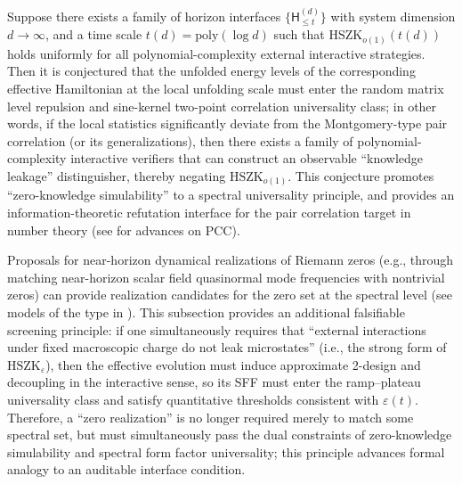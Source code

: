\begin{conjecture}[Spectral rigidity conjecture for horizon zero-knowledge: HSZK \texorpdfstring{$\Rightarrow$}{=>} sine-kernel correlations]\label{conj:discussion-horizon-zk-rigidity}
Suppose there exists a family of horizon interfaces \(\{\mathsf{H}^{(d)}_{\le t}\}\) with system dimension \(d\to\infty\), and a time scale \(t(d)=\mathrm{poly}(\log d)\) such that
\(\mathrm{HSZK}_{o(1)}(t(d))\)
holds uniformly for all polynomial-complexity external interactive strategies.
Then it is conjectured that the unfolded energy levels of the corresponding effective Hamiltonian at the local unfolding scale must enter the random matrix level repulsion and sine-kernel two-point correlation universality class;
in other words, if the local statistics significantly deviate from the Montgomery-type pair correlation (or its generalizations), then there exists a family of polynomial-complexity interactive verifiers that can construct an observable ``knowledge leakage'' distinguisher, thereby negating \(\mathrm{HSZK}_{o(1)}\).
This conjecture promotes ``zero-knowledge simulability'' to a spectral universality principle, and provides an information-theoretic refutation interface for the pair correlation target in number theory (see \cite{GoldstonLeeSchettlerSuriajaya2025PairCorrelationConjecture} for advances on PCC).
\end{conjecture}

\begin{remark}\label{rem:discussion-zk-filter-zero-realization}
Proposals for near-horizon dynamical realizations of Riemann zeros (e.g., through matching near-horizon scalar field quasinormal mode frequencies with nontrivial zeros) can provide realization candidates for the zero set at the spectral level (see models of the type in \cite{Giri2010PhysicalRealizationRiemannZerosBlackHole}).
This subsection provides an additional falsifiable screening principle: if one simultaneously requires that ``external interactions under fixed macroscopic charge do not leak microstates'' (i.e., the strong form of \(\mathrm{HSZK}_\varepsilon\)), then the effective evolution must induce approximate 2-design and decoupling in the interactive sense, so its SFF must enter the ramp--plateau universality class and satisfy quantitative thresholds consistent with \(\varepsilon(t)\).
Therefore, a ``zero realization'' is no longer required merely to match some spectral set, but must simultaneously pass the dual constraints of zero-knowledge simulability and spectral form factor universality; this principle advances formal analogy to an auditable interface condition.
\end{remark}

\endinput
